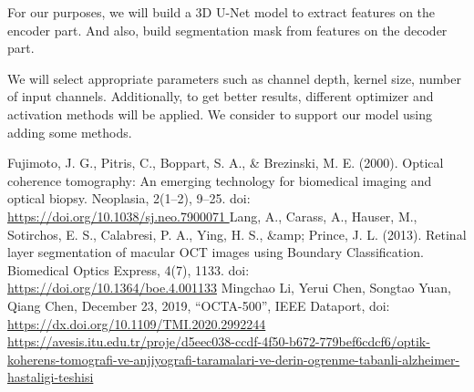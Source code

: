 \documentclass[conference]{IEEEtran}
\begin{document}
For our purposes, we will build a 3D U-Net model to extract features on the encoder part. And also, build segmentation mask from features on the decoder part.

We will select appropriate parameters such as channel depth, kernel size, number of input channels. Additionally, to get better results, different optimizer and activation methods will be applied. We consider to support our model using adding some methods. 

\begin{thebibliography}{00}
 Fujimoto, J. G., Pitris, C., Boppart, S. A., \& Brezinski, M. E. (2000). Optical coherence tomography: An emerging technology for biomedical imaging and optical biopsy. Neoplasia, 2(1–2), 9–25.
doi:\\\href{https://doi.org/10.1038/sj.neo.7900071 }{https://doi.org/10.1038/sj.neo.7900071 }
 Lang, A., Carass, A., Hauser, M., Sotirchos, E. S., Calabresi, P. A., Ying, H. S., \&amp; Prince, J. L. (2013). Retinal layer segmentation of macular OCT images using Boundary Classification. Biomedical Optics Express, 4(7), 1133. doi:\\\href{https://doi.org/10.1364/boe.4.001133 }{https://doi.org/10.1364/boe.4.001133}
 Mingchao Li, Yerui Chen, Songtao Yuan, Qiang Chen, December 23, 2019, ``OCTA-500'', IEEE Dataport, doi:\\\href{https://dx.doi.org/10.1109/TMI.2020.2992244}{https://dx.doi.org/10.1109/TMI.2020.2992244}
 \href{https://avesis.itu.edu.tr/proje/d5eec038-ccdf-4f50-b672-779bef6cdcf6/optik-koherens-tomografi-ve-anjiyografi-taramalari-ve-derin-ogrenme-tabanli-alzheimer-hastaligi-teshisi}{https://avesis.itu.edu.tr/proje/d5eec038-ccdf-4f50-b672-779bef6cdcf6/optik-koherens-tomografi-ve-anjiyografi-taramalari-ve-derin-ogrenme-tabanli-alzheimer-hastaligi-teshisi}
\end{thebibliography}
\end{document}

